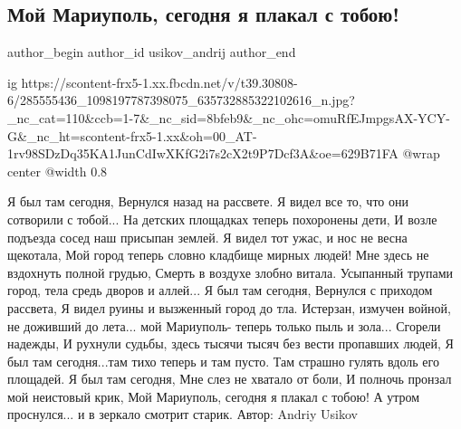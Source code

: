  
 
 
 
 
 
\subsection{Мой Мариуполь, сегодня я плакал с тобою!}
\label{sec:01_06_2022.fb.usikov_andrij.1.moj_mariupol_plakal_s_toboju}
 
\ifcmt
 author_begin
   author_id usikov_andrij
 author_end
\fi

\ifcmt
  ig https://scontent-frx5-1.xx.fbcdn.net/v/t39.30808-6/285555436_1098197787398075_635732885322102616_n.jpg?_nc_cat=110&ccb=1-7&_nc_sid=8bfeb9&_nc_ohc=omuRfEJmpgsAX-YCY-G&_nc_ht=scontent-frx5-1.xx&oh=00_AT-1rv98SDzDq35KA1JunCdIwXKfG2i7s2cX2t9P7Dcf3A&oe=629B71FA
  @wrap center
  @width 0.8
\fi

\begingroup
\Large
\obeycr
Я был там сегодня,
Вернулся назад на рассвете.
Я видел все то, что они сотворили с тобой...
На детских площадках теперь похоронены дети, 
И возле подъезда сосед наш присыпан землей.
\smallskip
Я видел тот ужас, и нос не весна щекотала, 
Мой город теперь словно кладбище мирных людей!
Мне здесь не вздохнуть полной грудью, 
Смерть в воздухе злобно витала.
\smallskip
Усыпанный трупами город, 
тела средь дворов и аллей...
Я был там сегодня,
Вернулся с приходом рассвета,
Я видел руины и вызженный город до тла. Истерзан, измучен войной, не доживший до лета...
мой Мариуполь- теперь только пыль и зола...
\smallskip
Сгорели надежды,
И рухнули судьбы, здесь тысячи тысяч без вести пропавших людей,
Я был там сегодня...там тихо теперь и там пусто. Там страшно гулять вдоль его площадей.
\smallskip
Я был там сегодня,
Мне слез не хватало от боли,
И полночь пронзал мой неистовый крик,
Мой Мариуполь, сегодня я плакал с тобою!
\smallskip
А утром проснулся... и в зеркало смотрит старик.
\smallskip
Автор: Andriy Usikov
\restorecr
\endgroup


